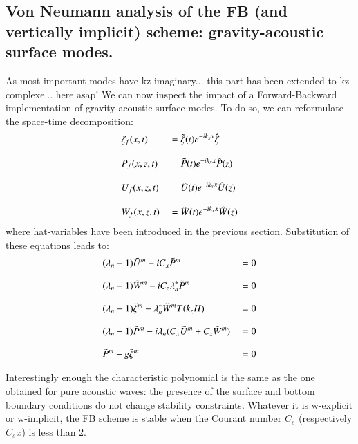 \documentclass[a4paper,11pt]{article}
\begin{document}
\subsection{Von Neumann analysis of the FB (and vertically implicit) scheme: gravity-acoustic surface modes.}
\label{Subsec-VNGV}

As most important modes have kz imaginary... this part has been extended to kz complexe... here asap! 
We can now inspect the impact of a Forward-Backward implementation of gravity-acoustic surface modes. To do so, we can reformulate the space-time decomposition:
\begin{equation}
   \begin{split}
    \displaystyle
     &\zeta_f(x,t)&&=\tilde{\zeta}(t) e^{-i k_x x}\hat{\zeta}\\[3mm]
     &P_f(x,z,t)  &&=\tilde{P}(t) e^{-i k_x x}\hat{P}(z)\\[3mm]
     &U_f(x,z,t)  &&=\tilde{U}(t) e^{-i k_x x}\hat{U}(z)\\[3mm]
     &W_f(x,z,t)  &&=\tilde{W}(t) e^{-i k_x x}\hat{W}(z)
   \end{split}
\end{equation}
where hat-variables have been introduced in the previous section. Substitution of these equations leads to:
\begin{equation}
   \begin{split}
    \displaystyle
    & (\lambda_{n}-1) \tilde{U}^{m}-i C_x \tilde{P}^{m} &&=0\\[3mm]
    \displaystyle
    & (\lambda_{n}-1) \tilde{W}^{m}-i C_z \lambda_{n}^* \tilde{P}^{m} &&=0\\[3mm]
    \displaystyle
    & (\lambda_{n}-1) \tilde{\zeta}^m-\lambda_{n}^* \tilde{W}^{m} T(k_z H) &&=0 \\[3mm]
    \displaystyle
    & (\lambda_{n}-1) \tilde{P}^{m}-i \lambda_{n} \huge( C_x \tilde{U}^{m}+ C_z \tilde{W}^{m}\huge) &&=0 \\[3mm]
    \displaystyle
    &\tilde{P}^{m}-g\tilde{\zeta}^{m} &&=0
   \end{split}
\end{equation}

Interestingly enough the characteristic polynomial is the same as the one obtained for pure acoustic waves: the presence of the surface and bottom boundary conditions do not change stability constraints. Whatever it is w-explicit or w-implicit, the FB scheme is stable when the Courant number $C_s$ (respectively $C_sx$) is less than 2.
\end{document}
